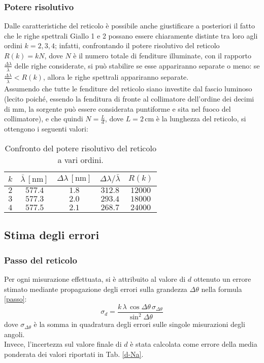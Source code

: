 \documentclass[]{article}
\let\oldsubsection\subsection%
\renewcommand{\subsection}{%
	\renewcommand{\theequation}{\thesubsection.\arabic{equation}}%
	\oldsubsection}%
\begin{document}
    \subsubsection{Potere risolutivo}
    Dalle caratteristiche del reticolo è possibile anche giustificare a posteriori il fatto che le righe spettrali Giallo 1 e 2 possano essere chiaramente distinte tra loro agli ordini $k = 2, 3, 4$; infatti, confrontando il potere risolutivo del reticolo $R(k) = k N$, dove $N$ è il numero totale di fenditure illuminate, con il rapporto $\frac{\Delta\lambda}{\bar{\lambda}}$ delle righe considerate, si può stabilire se esse appariranno separate o meno: se $\frac{\Delta\lambda}{\bar{\lambda}} < R(k)$, allora le righe spettrali appariranno separate.\\
    Assumendo che tutte le fenditure del reticolo siano investite dal fascio luminoso (lecito poiché, essendo la fenditura di fronte al collimatore dell'ordine dei decimi di mm, la sorgente può essere considerata puntiforme e sita nel fuoco del collimatore), e che quindi $N = \frac{L}{d}$, dove $L = 2 \,\text{cm}$ è la lunghezza del reticolo, si ottengono i seguenti valori:
    \begin{table}[H]
        \centering
        \begin{tabular}{||c|c|c|c|c||}
            \hline
            $k$ & $\bar{\lambda} \, \left[\text{nm}\right]$ & $\Delta\lambda \, \left[\text{nm}\right]$ & $\Delta\lambda/\bar{\lambda}$ & $R(k)$ \\
            \hline\hline
            $2$ & $577.4$ & $1.8$ & $312.8$ & $12000$ \\\hline
            $3$ & $577.3$ & $2.0$ & $293.4$ & $18000$ \\\hline
            $4$ & $577.5$ & $2.1$ & $268.7$ & $24000$ \\\hline
        \end{tabular}
        \caption{Confronto del potere risolutivo del reticolo a vari ordini.}
        \label{R}
    \end{table}

    \subsection{Stima degli errori}
    \subsubsection{Passo del reticolo}
    Per ogni misurazione effettuata, si è attribuito al valore di $d$ ottenuto un errore stimato mediante propagazione degli errori sulla grandezza $\Delta \theta$ nella formula \ref{passo}:
    \begin{equation}
        \label{d-error}
        \sigma_d = \frac{k \, \lambda \, \cos{\Delta\theta} \, \sigma_{\Delta \theta}}{\sin^2{\Delta\theta}}
    \end{equation}
    dove $\sigma_{\Delta\theta}$ è la somma in quadratura degli errori sulle singole misurazioni degli angoli.\\
    Invece, l'incertezza sul valore finale di $d$ è stata calcolata come errore della media ponderata dei valori riportati in Tab. \ref{d-Na}.
    \label{par:errore_passo}
\end{document}
